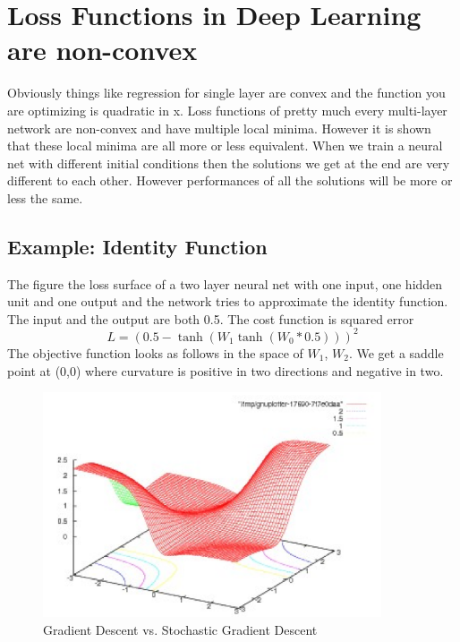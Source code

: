 \chapter{Loss Functions in Deep Learning are non-convex}\label{chp:Loss Functions in Deep Learning are non-convex}

Obviously things like regression for single layer are convex and the function you are optimizing is quadratic in x. Loss functions of pretty much every multi-layer network are non-convex and have multiple local minima. However it is shown that these local minima are all more or less equivalent. When we train a neural net with different initial conditions then the solutions we get at the end are very different to each other. However performances of all the solutions will be more or less the same. 

\section{Example: Identity Function}
The figure the loss surface of a two layer neural net with one input, one hidden unit and one output and the network tries to approximate the identity function. The input and the output are both 0.5. The cost function is squared error 
\begin{equation}
    L = (0.5 - \tanh (W_1 \tanh (W_0 * 0.5)))^2
\end{equation}
The objective function looks as follows in the space of $W_1$, $W_2$. We get a saddle point at (0,0) where curvature is positive in two directions and negative in two.\\

\begin{figure}[ht]
\centering
\includegraphics[width=100mm]{lectures/02-b/Identity.PNG}
\caption{Gradient Descent vs. Stochastic Gradient Descent}
\label{fig:sgd}
\end{figure}

